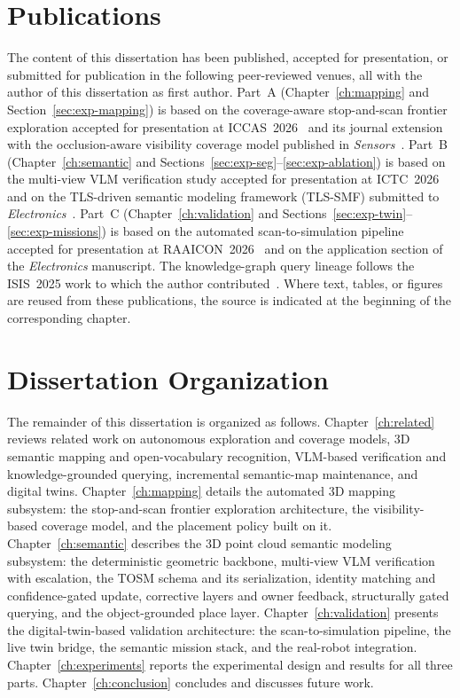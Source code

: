 \section{Publications}
\label{sec:publications}

The content of this dissertation has been published, accepted for presentation,
or submitted for publication in the following peer-reviewed venues, all with the author of this dissertation
as first author. Part~A (Chapter~\ref{ch:mapping} and
Section~\ref{sec:exp-mapping}) is based on the coverage-aware stop-and-scan
frontier exploration accepted for presentation at ICCAS~2026~\cite{iccas2026} and its journal
extension with the occlusion-aware visibility coverage model published in
\emph{Sensors}~\cite{kim2026sensors}. Part~B (Chapter~\ref{ch:semantic} and
Sections~\ref{sec:exp-seg}--\ref{sec:exp-ablation}) is based on the multi-view
VLM verification study accepted for presentation at ICTC~2026~\cite{kim2026ictc} and on the
TLS-driven semantic modeling framework (TLS-SMF) submitted to
\emph{Electronics}~\cite{kim2026electronics}. Part~C (Chapter~\ref{ch:validation}
and Sections~\ref{sec:exp-twin}--\ref{sec:exp-missions}) is based on the
automated scan-to-simulation pipeline accepted for presentation at RAAICON~2026~\cite{raaicon2026}
and on the application section of the \emph{Electronics} manuscript. The
knowledge-graph query lineage follows the ISIS~2025 work to which the author
contributed~\cite{kim2025isis}. Where text, tables, or figures are reused from
these publications, the source is indicated at the beginning of the
corresponding chapter.

\section{Dissertation Organization}
\label{sec:organization}

The remainder of this dissertation is organized as follows.
Chapter~\ref{ch:related} reviews related work on autonomous exploration and
coverage models, 3D semantic mapping and open-vocabulary recognition,
VLM-based verification and knowledge-grounded querying, incremental semantic-map
maintenance, and digital twins. Chapter~\ref{ch:mapping} details the automated
3D mapping subsystem: the stop-and-scan frontier exploration architecture, the
visibility-based coverage model, and the placement policy built on it.
Chapter~\ref{ch:semantic} describes the 3D point cloud semantic modeling
subsystem: the deterministic geometric backbone, multi-view VLM verification
with escalation, the TOSM schema and its serialization, identity matching and
confidence-gated update, corrective layers and owner feedback, structurally
gated querying, and the object-grounded place layer.
Chapter~\ref{ch:validation} presents the digital-twin-based validation
architecture: the scan-to-simulation pipeline, the live twin bridge, the
semantic mission stack, and the real-robot integration.
Chapter~\ref{ch:experiments} reports the experimental design and results for
all three parts. Chapter~\ref{ch:conclusion} concludes and discusses future
work.
